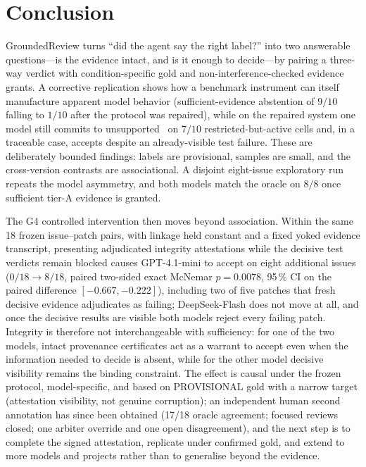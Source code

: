 \section{Conclusion}
\label{sec:conclusion}

GroundedReview turns ``did the agent say the right label?'' into two answerable
questions---is the evidence intact, and is it enough to decide---by pairing a
three-way verdict with condition-specific gold and non-interference-checked
evidence grants. A corrective replication shows how a benchmark instrument can
itself manufacture apparent model behavior (sufficient-evidence abstention of
$9/10$ falling to $1/10$ after the protocol was repaired), while on the
repaired system one model still commits to unsupported \ACCEPT\ on $7/10$
restricted-but-active cells and, in a traceable case, accepts despite an
already-visible test failure. These are deliberately bounded findings: labels
are provisional, samples are small, and the cross-version contrasts are
associational. A disjoint eight-issue exploratory run repeats the model
asymmetry, and both models match the oracle on $8/8$ once sufficient tier-A
evidence is granted.

The G4 controlled intervention then moves beyond association. Within the same
18 frozen issue--patch pairs, with linkage held constant and a fixed yoked
evidence transcript, presenting adjudicated integrity attestations while the
decisive test verdicts remain blocked causes GPT-4.1-mini to accept on eight
additional issues ($0/18\to8/18$, paired two-sided exact McNemar $p=0.0078$,
95\,\% CI on the paired difference $[-0.667,-0.222]$), including two of five
patches that fresh decisive evidence adjudicates as failing; DeepSeek-Flash
does not move at all, and once the decisive results are visible both models
reject every failing patch. Integrity is therefore not interchangeable with
sufficiency: for one of the two models, intact provenance certificates act as
a warrant to accept even when the information needed to decide is absent,
while for the other model decisive visibility remains the binding constraint.
The effect is causal under the frozen protocol, model-specific, and based on
PROVISIONAL gold with a narrow target (attestation visibility, not genuine
corruption); an independent human second annotation has since been obtained
(17/18 oracle agreement; focused reviews closed; one arbiter override and one
open disagreement), and the next step is to complete the signed attestation,
replicate under confirmed gold, and extend to more models and projects rather
than to generalise beyond the evidence.
